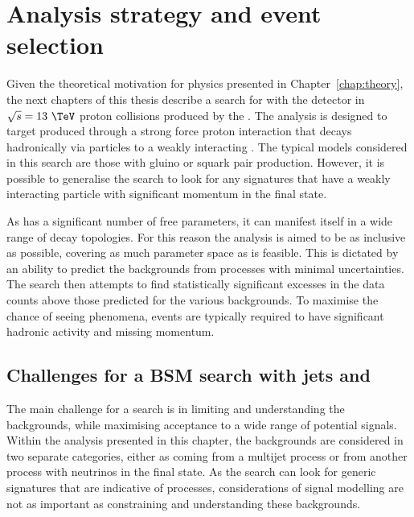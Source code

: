 \chapter{Analysis strategy and event selection} %
\label{chap:selection}

Given the theoretical motivation for \BSM physics presented in
Chapter~\ref{chap:theory}, the next chapters of this thesis describe a
search for \SUSY with the \CMS detector in $\sqrt{s}=13~\tev$ proton collisions
produced by the \LHC. The analysis is designed to target \SUSY
produced through a strong force proton interaction that decays hadronically via
\SM particles to a weakly interacting \LSP. The typical \SUSY models
considered in this search are those with gluino or squark pair
production. However, it is possible to generalise the search to look
for any \BSM signatures that have a weakly interacting particle with
significant momentum in the final state.

As \SUSY has a significant number of free parameters, it can manifest
itself in a wide range of decay topologies. For this reason the
analysis is aimed to be as inclusive as possible, covering as much
parameter space as is feasible.  This is dictated by an ability to
predict the backgrounds from \SM processes with minimal uncertainties.
The search then attempts to find statistically significant excesses in
the data counts above those predicted for the various backgrounds. To
maximise the chance of seeing \BSM phenomena, events are typically
required to have significant hadronic activity and missing momentum.  


\section{Challenges for a BSM search with jets and \MET}
\label{sec:challenge}

The main challenge for a \BSM search is in limiting and
understanding the backgrounds, while maximising acceptance to a wide
range of potential \BSM signals. Within the analysis presented in this
chapter, the backgrounds are considered in two separate categories,
either as coming from a \QCD multijet process or from another \SM process
with neutrinos in the final state. As the search can look for generic
signatures that are indicative of \BSM processes, considerations of
signal modelling are not as important as constraining
and understanding these backgrounds.

